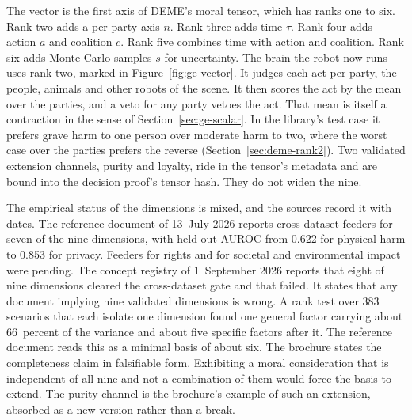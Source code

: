 The vector is the first axis of DEME's moral tensor, which has ranks one to six. Rank two adds a
per-party axis $n$. Rank three adds time $\tau$. Rank four adds action $a$ and coalition $c$.
Rank five combines time with action and coalition. Rank six adds Monte Carlo samples $s$ for
uncertainty.
The brain the robot now runs uses rank two, marked in Figure~\ref{fig:ge-vector}. It judges each
act per party, the people, animals and other robots of the scene. It then scores the act by the
mean over the parties, and a veto for any party vetoes the act. That mean is itself a contraction
in the sense of Section~\ref{sec:ge-scalar}. In the library's test case it prefers grave harm to one person over moderate harm
to two, where the worst case over the parties prefers the reverse (Section~\ref{sec:deme-rank2}).
Two validated extension channels, purity and loyalty, ride in the tensor's metadata and are bound
into the decision proof's tensor hash. They do not widen the nine.

The empirical status of the dimensions is mixed, and the sources record it with dates. The
reference document of 13~July 2026 reports cross-dataset feeders for seven of the nine dimensions,
with held-out AUROC from 0.622 for physical harm to 0.853 for privacy. Feeders for rights and for
societal and environmental impact were pending.
The concept registry of 1~September 2026 reports that eight of nine dimensions cleared the
cross-dataset gate and that  failed. It states that any document implying
nine validated dimensions is wrong.
A rank test over 383 scenarios that each isolate one dimension found one general factor carrying
about 66~percent of the variance and about five specific factors after it. The reference document
reads this as a minimal basis of about six.
The brochure states the completeness claim in falsifiable form. Exhibiting a moral consideration
that is independent of all nine and not a combination of them would force the basis to extend.
The purity channel is the brochure's example of such an extension, absorbed as a new version
rather than a break.

